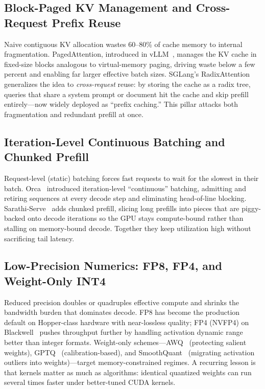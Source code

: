\documentclass[11pt]{article}
\begin{document}
\subsection{Block-Paged KV Management and Cross-Request Prefix Reuse}
Naive contiguous KV allocation wastes 60--80\% of cache memory to internal fragmentation.
PagedAttention, introduced in vLLM~\cite{vllm}, manages the KV cache in fixed-size blocks analogous to
virtual-memory paging, driving waste below a few percent and enabling far larger effective batch sizes.
SGLang's RadixAttention~\cite{sglang} generalizes the idea to \emph{cross-request} reuse: by storing the cache
as a radix tree, queries that share a system prompt or document hit the cache and skip prefill
entirely---now widely deployed as ``prefix caching.'' This pillar attacks both fragmentation and redundant
prefill at once.

\subsection{Iteration-Level Continuous Batching and Chunked Prefill}
Request-level (static) batching forces fast requests to wait for the slowest in their batch.
Orca~\cite{orca} introduced iteration-level ``continuous'' batching, admitting and retiring sequences at every
decode step and eliminating head-of-line blocking. Sarathi-Serve~\cite{sarathi} adds chunked prefill, slicing
long prefills into pieces that are piggy-backed onto decode iterations so the GPU stays compute-bound rather
than stalling on memory-bound decode. Together they keep utilization high without sacrificing tail latency.

\subsection{Low-Precision Numerics: FP8, FP4, and Weight-Only INT4}
Reduced precision doubles or quadruples effective compute and shrinks the bandwidth burden that dominates
decode. FP8 has become the production default on Hopper-class hardware with near-lossless quality; FP4 (NVFP4)
on Blackwell~\cite{nim} pushes throughput further by handling activation dynamic range better than integer
formats. Weight-only schemes---AWQ~\cite{awq} (protecting salient weights), GPTQ~\cite{gptq}
(calibration-based), and SmoothQuant~\cite{smoothquant} (migrating activation outliers into weights)---target
memory-constrained regimes. A recurring lesson is that kernels matter as much as algorithms: identical
quantized weights can run several times faster under better-tuned CUDA kernels.
\end{document}
